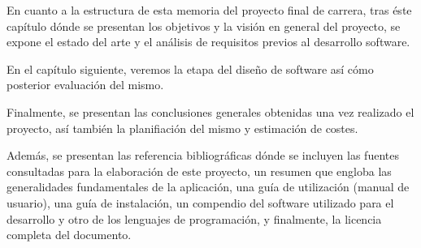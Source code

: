 En cuanto a la estructura de esta memoria del proyecto final de carrera, tras éste capítulo dónde se presentan los objetivos y la visión en general del proyecto, se expone el estado del arte y el análisis de requisitos previos al desarrollo software.

En el capítulo siguiente, veremos la etapa del diseño de software así cómo posterior evaluación del mismo.

Finalmente, se presentan las conclusiones generales obtenidas una vez realizado el proyecto, así también la planifiación del mismo y estimación de costes.

Además, se presentan las referencia bibliográficas dónde se incluyen las fuentes consultadas para la elaboración de este proyecto, un resumen que engloba las generalidades fundamentales de la aplicación, una guía de utilización (manual de usuario), una guía de instalación, un compendio del software utilizado para el desarrollo y otro de los lenguajes de programación, y finalmente, la licencia completa del documento.
